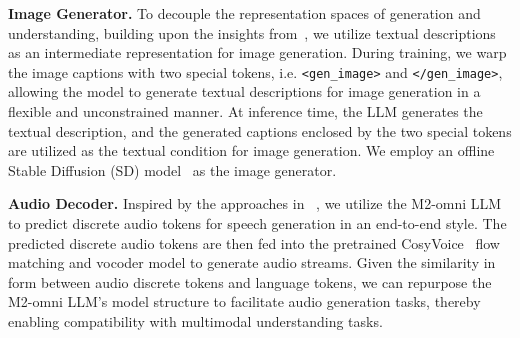 \textbf{Image Generator.} To decouple the representation spaces of generation and understanding, building upon the insights from~\cite{li2023textbind, unifiedmllm, wang2024modaverse}, we utilize textual descriptions as an intermediate representation for image generation. During training, we warp the image captions with two special tokens, i.e. \texttt{<gen\_image>} and \texttt{</gen\_image>},  allowing the model to generate textual descriptions for image generation in a flexible and unconstrained manner. At inference time, the \method LLM generates the textual description, and the generated captions enclosed by the two special tokens are utilized as the textual condition for image generation. We employ an offline Stable Diffusion (SD) model~\cite{sd_2022} as the image generator.

\textbf{Audio Decoder.}
Inspired by the approaches in ~\cite{MinMo, mini_omni2}, we utilize the M2-omni LLM to predict discrete audio tokens for speech generation in an end-to-end style. The predicted discrete audio tokens are then fed into the pretrained CosyVoice~\cite{du2024cosyvoice} flow matching and vocoder model to generate audio streams. Given the similarity in form between audio discrete tokens and language tokens, we can repurpose the M2-omni LLM's model structure to facilitate audio generation tasks, thereby enabling compatibility with multimodal understanding tasks.


